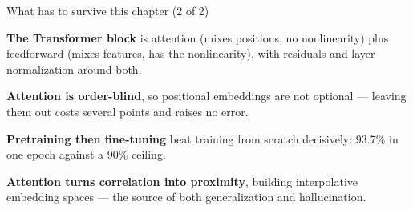 \documentclass[aspectratio=169,11pt,t]{beamer}
\begin{document}
\begin{frame}[shrink=25]{What has to survive this chapter (2 of 2)}
\begin{isteps}
\item \textbf{The Transformer block} is attention (mixes positions, no nonlinearity) plus feedforward (mixes features, has the nonlinearity), with residuals and layer normalization around both.
\item \textbf{Attention is order-blind}, so positional embeddings are not optional --- leaving them out costs several points and raises no error.
\item \textbf{Pretraining then fine-tuning} beat training from scratch decisively: 93.7\% in one epoch against a 90\% ceiling.
\item \textbf{Attention turns correlation into proximity}, building interpolative embedding spaces --- the source of both generalization and hallucination.
\end{isteps}
\vskip 4pt
\vskip 2pt
\end{frame}
\end{document}
